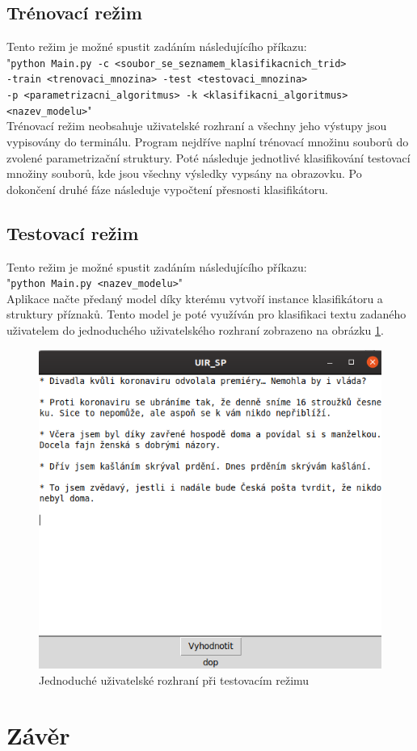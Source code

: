 \documentclass[ 12pt, a4paper]{article}
\begin{document}
\subsection{Trénovací režim}
Tento režim je možné spustit zadáním následujícího příkazu:\\
"\texttt{python Main.py -c <soubor\_se\_seznamem\_klasifikacnich\_trid> 
	\\-train <trenovaci\_mnozina> -test <testovaci\_mnozina> 
	\\-p <parametrizacni\_algoritmus> -k <klasifikacni\_algoritmus> 
	\\<nazev\_modelu>}"\\

Trénovací režim neobsahuje uživatelské rozhraní a všechny jeho výstupy jsou vypisovány do terminálu. Program nejdříve naplní trénovací množinu souborů do zvolené parametrizační struktury. Poté následuje jednotlivé klasifikování testovací množiny souborů, kde jsou všechny výsledky vypsány na obrazovku. Po dokončení druhé fáze následuje vypočtení přesnosti klasifikátoru.


\subsection{Testovací režim}
Tento režim je možné spustit zadáním následujícího příkazu:\\
"\texttt{python Main.py <nazev\_modelu>}"\\
Aplikace načte předaný model díky kterému vytvoří instance klasifikátoru a struktury příznaků. Tento model je poté využíván pro klasifikaci textu zadaného uživatelem do jednoduchého uživatelského rozhraní zobrazeno na obrázku \ref{fig:screenshot001}. 

 \begin{figure}
 	\centering
 	\includegraphics[width=0.7\linewidth]{screenshot001}
 	\caption{Jednoduché uživatelské rozhraní při testovacím režimu}
 	\label{fig:screenshot001}
 \end{figure}
 

\newpage
\section{Závěr}


\newpage
\end{document}
